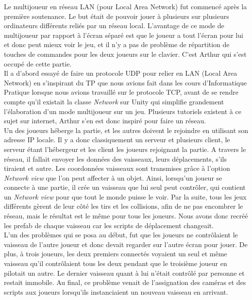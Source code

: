 \documentclass[12pt, titlepage]{article}
\begin{document}
\begin{spacing}{1.5}
Le multijoueur en réseau LAN (pour Local Area Network) fut commencé après la première soutenance. Le but était de pouvoir jouer à plusieurs sur plusieurs ordinateurs différents reliés par un réseau local. L'avantage de ce mode de multijoueur par rapport à l'écran séparé est que le joueur a tout l'écran pour lui et donc peut mieux voir le jeu, et il n'y a pas de problème de répartition de touches de commandes pour les deux joueurs sur le clavier. C'est Arthur qui s'est occupé de cette partie.\\

Il a d'abord essayé de faire un protocole UDP pour relier en LAN (Local Area Network) en s'inspirant du TP que nous avions fait dans les cours d'Informatique Pratique lorsque nous avions travaillé sur le protocole TCP, avant de se rendre compte qu'il existait la classe \textit{Network} sur Unity qui simplifie grandement l'élaboration d'un mode multijoueur sur un jeu. Plusieurs tutoriels existent à ce sujet sur internet, Arthur s'en est donc inspiré pour faire un réseau.\\

Un des joueurs héberge la partie, et les autres doivent le rejoindre en utilisant son adresse IP locale. Il y a donc classiquement un serveur et plusieurs client, le serveur étant l'hébergeur et les client les joueurs rejoignant la partie. A travers le réseau, il fallait envoyer les données des vaisseaux, leurs déplacements, s'ils tiraient et autre. Les coordonnées vaisseaux sont transmises grâce à l'option \textit{Network view} que l'on peut affecter à un objet. Ainsi, lorsqu'un joueur se connecte à une partie, il crée un vaisseau que lui seul peut contrôler, qui contient un \textit{Network view} pour que tout le monde puisse le voir. Par la suite, tous les jeux différents gèrent de leur côté les tirs et les collisions, afin de ne pas encombrer le réseau, mais le résultat est le même pour tous les joueurs. Nous avons donc recréé les prefab de chaque vaisseau car les scripts de déplacement changeait.\\

L'un des problèmes qui se posa au début, fut que les joueurs ne contrôlaient le vaisseau de l'autre joueur et donc devait regarder sur l'autre écran pour jouer. De plus, à trois joueurs, les deux
premiers connectés voyaient un seul et même vaisseau qu'il contrôlaient tous les deux pendant que le troisième joueur en pilotait un autre. Le dernier vaisseau quant à lui n'était contrôlé par personne et restait immobile. Au final, ce problème venait de l'assignation des caméras et des scripts aux joueurs lorsqu'ils instanciaient un nouveau vaisseau en arrivant.\\


\end{spacing}
\end{document}
